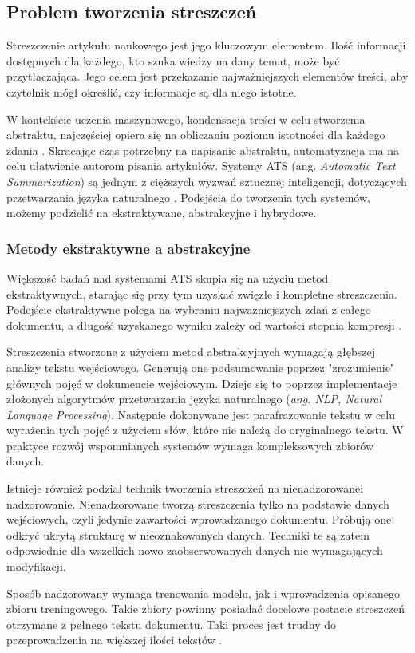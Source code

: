 \documentclass[12pt,a4paper,twoside]{article}
\begin{document}
\subsection{Problem tworzenia streszczeń}
Streszczenie artykułu naukowego jest jego kluczowym elementem. Ilość informacji dostępnych dla każdego, kto szuka wiedzy na dany temat, może być przytłaczająca. Jego celem jest przekazanie najważniejszych elementów treści, aby czytelnik mógł określić, czy informacje są dla niego istotne. \par
W kontekście uczenia maszynowego, kondensacja treści w celu stworzenia abstraktu, najczęściej opiera się na obliczaniu poziomu istotności dla każdego zdania \cite{MUTLU2020102359}. Skracając czas potrzebny na napisanie abstraktu, automatyzacja ma na celu ułatwienie autorom pisania artykułów. Systemy ATS (ang. \textit{Automatic Text Summarization}) są jednym z cięższych wyzwań sztucznej inteligencji, dotyczących przetwarzania języka naturalnego \cite{ELKASSAS2021113679}. Podejścia do tworzenia tych systemów, możemy podzielić na ekstraktywane, abstrakcyjne i hybrydowe. 
\subsubsection{Metody ekstraktywne a abstrakcyjne}
Większość badań nad systemami ATS skupia się na użyciu metod ekstraktywnych, starając się przy tym uzyskać zwięzłe i kompletne streszczenia. Podejście ekstraktywne polega na wybraniu najważniejszych zdań z całego dokumentu, a długość uzyskanego wyniku zależy od wartości stopnia kompresji \cite{Gambhir2017}. \par
Streszczenia stworzone z użyciem metod abstrakcyjnych wymagają głębszej analizy tekstu wejściowego. Generują one podsumowanie poprzez "zrozumienie" głównych pojęć w dokumencie wejściowym. Dzieje się to poprzez implementacje złożonych algorytmów przetwarzania języka naturalnego (\textit{ang. NLP, Natural Language Processing}). Następnie dokonywane jest parafrazowanie tekstu w celu wyrażenia tych pojęć z użyciem słów, które nie należą do oryginalnego tekstu. W praktyce rozwój wspomnianych systemów wymaga kompleksowych zbiorów danych.\par
Istnieje również podział technik tworzenia streszczeń na nienadzorowane\break i nadzorowanie. Nienadzorowane tworzą streszczenia tylko na podstawie danych wejściowych, czyli jedynie zawartości wprowadzanego dokumentu. Próbują one odkryć ukrytą strukturę w nieoznakowanych danych. Techniki te są zatem odpowiednie dla wszelkich nowo zaobserwowanych danych nie wymagających modyfikacji.\par
Sposób nadzorowany wymaga trenowania modelu, jak i wprowadzenia opisanego zbioru treningowego. Takie zbiory powinny posiadać docelowe postacie streszczeń otrzymane z pełnego tekstu dokumentu. Taki proces jest trudny do przeprowadzenia na większej ilości tekstów \cite{ELKASSAS2021113679}.
\end{document}
